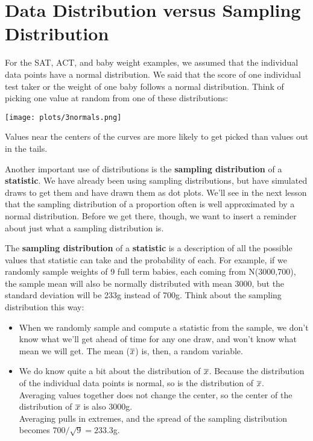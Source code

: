 \def\theTopic{Reading 18}


\section{ Data Distribution versus Sampling Distribution }



For the SAT,  ACT, and baby weight examples, we assumed that the
individual data points have a normal distribution.   We said that the
score of one individual test taker or the weight of one baby follows a
normal distribution.  Think of picking one value at random from one of
these distributions:




\texttt{[image: plots/3normals.png]}

Values near the centers of the curves are more likely to get picked
than values out in the tails. 



Another important use of distributions is the {\bf sampling
  distribution} of a {\bf statistic}.  We have already been using sampling
distributions, but have simulated draws to get them and have drawn
them as dot plots.  We'll see in the next lesson that the sampling
distribution of a proportion often is well approximated by a normal
distribution. Before we get there, though, we want to insert a
reminder about just what a sampling distribution is.

The {\bf sampling distribution} of a {\bf statistic} is a description
of all the possible values that statistic can take and the probability
of each.  For example, if we randomly sample weights of 9 full term
babies, each coming from N(3000,700), the sample mean will also be
normally distributed with mean 3000, but the standard deviation will
be 233g instead of 700g.  Think about the sampling distribution this
way: 
\begin{itemize}
\item When we randomly sample and compute a statistic from the sample,
  we don't know what we'll get ahead of time for any one draw, and
  won't know what mean we will get.  The mean ($\overline{x}$) is, then, a random
  variable.
\item We do know quite a bit about the distribution of $\overline{x}$. Because
  the distribution of the individual data points is normal, so is the
  distribution of $\overline{x}$. \\
  Averaging values together does not change the
  center, so the center of the distribution of $\overline{x}$ is also 3000g.  \\
  Averaging pulls in extremes, and the spread of the sampling
  distribution becomes $700/\sqrt{9} = 233.3$g.
\end{itemize}\vspace{1in}



